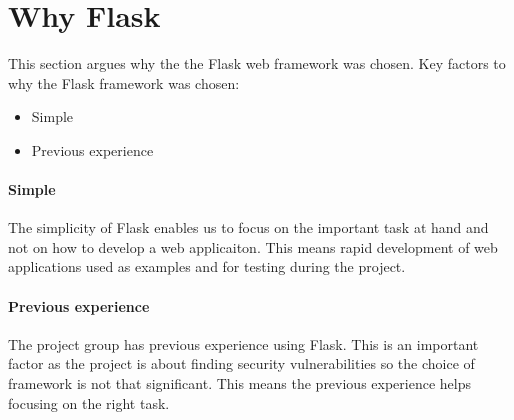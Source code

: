 \section{Why Flask}
This section argues why the the Flask web framework was chosen.
Key factors to why the Flask framework was chosen:
\begin{itemize}
\item Simple
\item Previous experience
\end{itemize}

\paragraph{Simple}
The simplicity of Flask enables us to focus on the important task at hand and not on how to develop a web applicaiton.
This means rapid development of web applications used as examples and for testing during the project.
\paragraph{Previous experience}
The project group has previous experience using Flask.
This is an important factor as the project is about finding security vulnerabilities so the choice of framework is not that significant.
This means the previous experience helps focusing on the right task.
